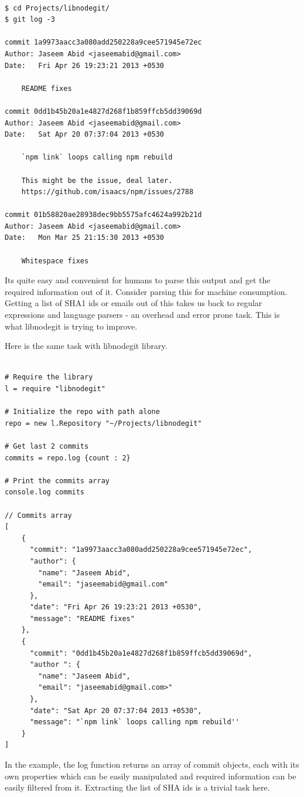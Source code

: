 \begin{verbatim}

$ cd Projects/libnodegit/
$ git log -3

commit 1a9973aacc3a080add250228a9cee571945e72ec
Author: Jaseem Abid <jaseemabid@gmail.com>
Date:   Fri Apr 26 19:23:21 2013 +0530

    README fixes

commit 0dd1b45b20a1e4827d268f1b859ffcb5dd39069d
Author: Jaseem Abid <jaseemabid@gmail.com>
Date:   Sat Apr 20 07:37:04 2013 +0530

    `npm link` loops calling npm rebuild

    This might be the issue, deal later.
    https://github.com/isaacs/npm/issues/2788

commit 01b58820ae28938dec9bb5575afc4624a992b21d
Author: Jaseem Abid <jaseemabid@gmail.com>
Date:   Mon Mar 25 21:15:30 2013 +0530

    Whitespace fixes

\end{verbatim}

Its quite easy and convenient for humans to parse this output and get the
required information out of it. Consider parsing this for machine consumption.
Getting a list of SHA1 ids or emails out of this takes us back to regular
expressions and language parsers - an overhead and error prone task. This is
what libnodegit is trying to improve.

Here is the same task with libnodegit library.

\begin{verbatim}

# Require the library
l = require "libnodegit"

# Initialize the repo with path alone
repo = new l.Repository "~/Projects/libnodegit"

# Get last 2 commits
commits = repo.log {count : 2}

# Print the commits array
console.log commits

// Commits array
[
    {
      "commit": "1a9973aacc3a080add250228a9cee571945e72ec",
      "author": {
        "name": "Jaseem Abid",
        "email": "jaseemabid@gmail.com"
      },
      "date": "Fri Apr 26 19:23:21 2013 +0530",
      "message": "README fixes"
    },
    {
      "commit": "0dd1b45b20a1e4827d268f1b859ffcb5dd39069d",
      "author ": {
        "name": "Jaseem Abid",
        "email": "jaseemabid@gmail.com>"
      },
      "date": "Sat Apr 20 07:37:04 2013 +0530",
      "message": "`npm link` loops calling npm rebuild''
    }
]

\end{verbatim}

In the example, the log function returns an array of commit objects, each with
its own properties which can be easily manipulated and required information can
be easily filtered from it. Extracting the list of SHA ids is a trivial task
here.
